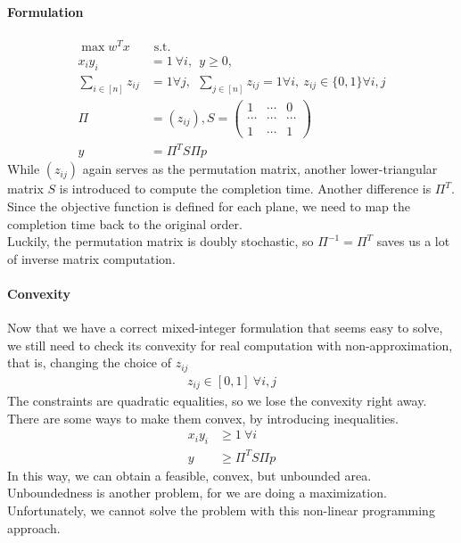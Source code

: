 \documentclass[12pt,letterpaper]{article}
\begin{document}
\paragraph{Formulation}
\begin{align*}
    \max w^Tx& \text{ s.t. } \label{eq:C} \tag{C} \\
 x_i y_i &= 1 \ \forall i, \ \ y \geq 0, \\ 
    \sum_{i \in [n]} z_{ij} &= 1 \forall j,  \ \ 
    \sum_{j \in [n]} z_{ij} = 1 \forall i,  \ z_{ij} \in \{0, 1\} \forall i, j \\ 
    \Pi &= (z_{ij}), S = \begin{pmatrix}
        1 & \cdots & 0 \\ 
        \cdots & \cdots & \cdots \\ 
        1 & \cdots & 1
    \end{pmatrix} \\
 y &= \Pi^T S \Pi p 
\end{align*}
While $(z_{ij})$ again serves as the permutation matrix, another lower-triangular matrix $S$ is introduced to
compute the completion time. Another difference is $\Pi^T$. Since the objective function is defined  
for each plane, we need to map the completion time back to the original order.\\
Luckily, the permutation matrix is doubly stochastic, so $\Pi^{-1} = \Pi^T$ saves us a lot of inverse matrix computation. 

\paragraph{Convexity}
Now that we have a correct mixed-integer formulation that seems easy to solve, we still need to check its convexity for 
real computation with non-approximation, that is, changing the choice of $z_{ij}$
\begin{align*}
 z_{ij} \in [0, 1] \ \forall i, j
\end{align*}
The constraints are quadratic equalities, so we lose the convexity right away. 
There are some ways to make them convex, by introducing inequalities. 
\begin{align*}
 x_i y_i &\geq 1 \ \forall i \\
 y &\geq \Pi^T S \Pi p
\end{align*}
In this way, we can obtain a feasible, convex, but unbounded area. 
Unboundedness is another problem, for we are doing a maximization. 
Unfortunately, we cannot solve the problem with this non-linear programming approach. 
\end{document}
